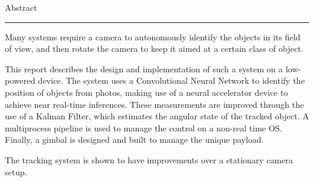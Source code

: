 {\Large Abstract}\\
\hrule


Many systems require a camera to autonomously identify the objects in its field of view, and then rotate the camera to keep it aimed at a certain class of object.

This report describes the design and implementation of such a system on a low-powered device. The system uses a Convolutional Neural Network to identify the position of objects from photos, making use of a neural accelerator device to achieve near real-time inferences. These measurements are improved through the use of a Kalman Filter, which estimates the angular state of the tracked object. A multiprocess pipeline is used to manage the control on a non-real time OS. Finally, a gimbal is designed and built to manage the unique payload.

The tracking system is shown to have improvements over a stationary camera setup.

\newpage
